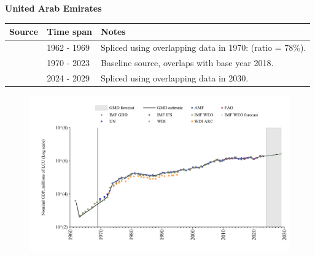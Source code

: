 \documentclass[12pt,a4paper,landscape]{article}
\begin{document}
\begin{adjustbox}{max totalsize={\paperwidth}{\paperheight},center}
\begin{minipage}[t][\textheight][t]{\textwidth}
\vspace*{0.5cm}
{}
\begin{center}
{\Large\bfseries United Arab Emirates}
\end{center}
\vspace{0.5cm}
\begin{table}[H]
\centering
\small
\begin{tabular}{|l|l|l|}
\hline
\textbf{Source} & \textbf{Time span} & \textbf{Notes} \\
\hline
\rowcolor{white}\cite{IMF_GDD}& 1962 - 1969 &Spliced using overlapping data in 1970: (ratio = 78\%).\\
\rowcolor{lightgray}\cite{WDI}& 1970 - 2023 &Baseline source, overlaps with base year 2018.\\
\rowcolor{white}\cite{IMF_WEO_forecast}& 2024 - 2029 &Spliced using overlapping data in 2030.\\
\hline
\end{tabular}
\end{table}
\begin{figure}[H]
\centering
\includegraphics[width=\textwidth,height=0.6\textheight,keepaspectratio]{graphs/ARE_nGDP.pdf}
\end{figure}
\end{minipage}
\end{adjustbox}
\end{document}
